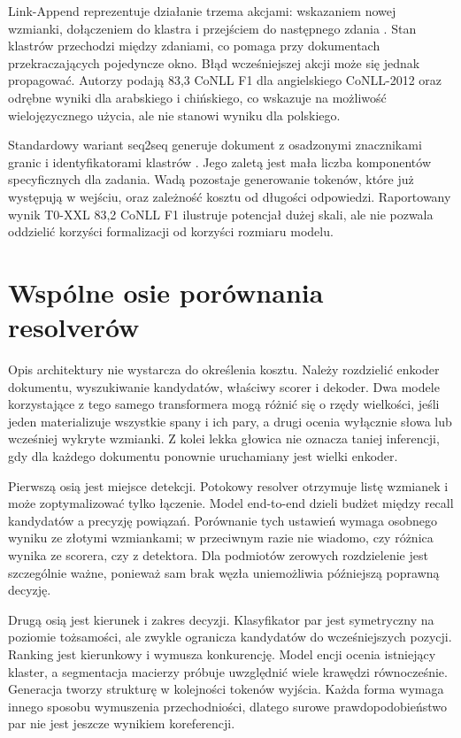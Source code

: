 Link-Append reprezentuje działanie trzema akcjami: wskazaniem nowej wzmianki, dołączeniem do klastra i przejściem do następnego zdania \cite{bohnet_2023_linkappend}. Stan klastrów przechodzi między zdaniami, co pomaga przy dokumentach przekraczających pojedyncze okno. Błąd wcześniejszej akcji może się jednak propagować. Autorzy podają 83,3 CoNLL F1 dla angielskiego CoNLL-2012 oraz odrębne wyniki dla arabskiego i chińskiego, co wskazuje na możliwość wielojęzycznego użycia, ale nie stanowi wyniku dla polskiego.

Standardowy wariant seq2seq generuje dokument z osadzonymi znacznikami granic i identyfikatorami klastrów \cite{zhang_2023_seq2seq}. Jego zaletą jest mała liczba komponentów specyficznych dla zadania. Wadą pozostaje generowanie tokenów, które już występują w wejściu, oraz zależność kosztu od długości odpowiedzi. Raportowany wynik T0-XXL 83,2 CoNLL F1 ilustruje potencjał dużej skali, ale nie pozwala oddzielić korzyści formalizacji od korzyści rozmiaru modelu.

\section{Wspólne osie porównania resolverów}
\label{sec:osie-porownania}

Opis architektury nie wystarcza do określenia kosztu. Należy rozdzielić enkoder dokumentu, wyszukiwanie kandydatów, właściwy scorer i dekoder. Dwa modele korzystające z tego samego transformera mogą różnić się o rzędy wielkości, jeśli jeden materializuje wszystkie spany i ich pary, a drugi ocenia wyłącznie słowa lub wcześniej wykryte wzmianki. Z kolei lekka głowica nie oznacza taniej inferencji, gdy dla każdego dokumentu ponownie uruchamiany jest wielki enkoder.

Pierwszą osią jest miejsce detekcji. Potokowy resolver otrzymuje listę wzmianek i może zoptymalizować tylko łączenie. Model end-to-end dzieli budżet między recall kandydatów a precyzję powiązań. Porównanie tych ustawień wymaga osobnego wyniku ze złotymi wzmiankami; w przeciwnym razie nie wiadomo, czy różnica wynika ze scorera, czy z detektora. Dla podmiotów zerowych rozdzielenie jest szczególnie ważne, ponieważ sam brak węzła uniemożliwia późniejszą poprawną decyzję.

Drugą osią jest kierunek i zakres decyzji. Klasyfikator par jest symetryczny na poziomie tożsamości, ale zwykle ogranicza kandydatów do wcześniejszych pozycji. Ranking jest kierunkowy i wymusza konkurencję. Model encji ocenia istniejący klaster, a segmentacja macierzy próbuje uwzględnić wiele krawędzi równocześnie. Generacja tworzy strukturę w kolejności tokenów wyjścia. Każda forma wymaga innego sposobu wymuszenia przechodniości, dlatego surowe prawdopodobieństwo par nie jest jeszcze wynikiem koreferencji.

